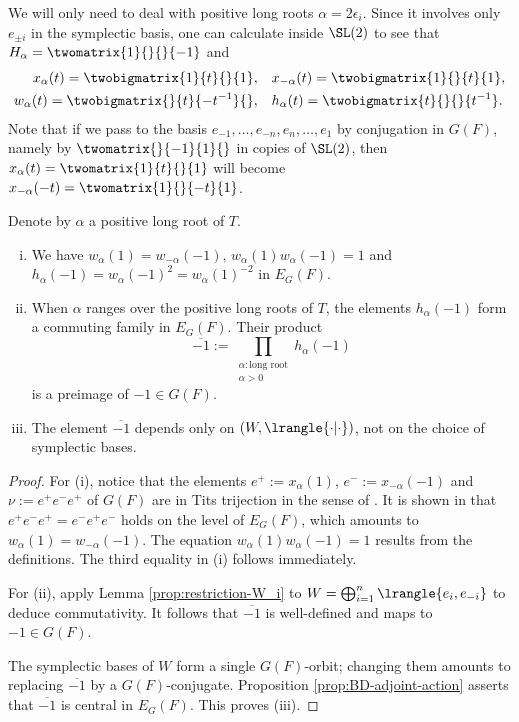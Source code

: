 \documentclass[a4paper,10pt]{article}
\begin{document}
We will only need to deal with positive long roots $\alpha = 2\epsilon_i$. Since it involves only $e_{\pm i}$ in the symplectic basis, one can calculate inside $\SL(2)$ to see that $H_\alpha = \twomatrix{1}{}{}{-1}$ and
\begin{align*}
	x_\alpha(t) = \twobigmatrix{1}{t}{}{1}, & \quad x_{-\alpha}(t) = \twobigmatrix{1}{}{t}{1}, \\
	w_\alpha(t) = \twobigmatrix{}{t}{-t^{-1}}{}, & \quad h_\alpha(t) = \twobigmatrix{t}{}{}{t^{-1}}.
\end{align*}
Note that if we pass to the basis $e_{-1}, \ldots, e_{-n}, e_n, \ldots, e_1$ by conjugation in $G(F)$, namely by $\twomatrix{}{-1}{1}{}$ in copies of $\SL(2)$, then $x_\alpha(t) = \twomatrix{1}{t}{}{1}$ will become $x_{-\alpha}(-t) = \twomatrix{1}{}{-t}{1}$.

\begin{lemma}\label{prop:minus-1-refined}
	Denote by $\alpha$ a positive long root of $T$.
	\begin{enumerate}[(i)]
		\item We have $w_\alpha(1) = w_{-\alpha}(-1)$, $w_\alpha(1) w_\alpha(-1) = 1$ and $h_\alpha(-1) = w_\alpha(-1)^2 = w_\alpha(1)^{-2}$ in $E_G(F)$.
		\item When $\alpha$ ranges over the positive long roots of $T$, the elements $h_\alpha(-1)$ form a commuting family in $E_G(F)$. Their product
			\[ \overline{-1} := \prod_{\substack{\alpha: \text{long root} \\ \alpha > 0 }} h_\alpha(-1) \]
			is a preimage of $-1 \in G(F)$.
		\item The element $\overline{-1}$ depends only on $(W, \lrangle{\cdot|\cdot})$, not on the choice of symplectic bases.
	\end{enumerate}
\end{lemma}
\begin{proof}
	For (i), notice that the elements $e^+ := x_\alpha(1)$, $e^- := x_{-\alpha}(-1)$ and $\nu := e^+ e^- e^+$ of $G(F)$ are in Tits trijection in the sense of \cite[11.1]{BD01}. It is shown in \cite[p.73]{BD01} that $e^+ e^- e^+ = e^- e^+ e^-$ holds on the level of $E_G(F)$, which amounts to $w_\alpha(1) = w_{-\alpha}(-1)$. The equation $w_\alpha(1)w_\alpha(-1)=1$ results from the definitions. The third equality in (i) follows immediately.
	
	For (ii), apply Lemma \ref{prop:restriction-W_i} to $W = \bigoplus_{i=1}^n \lrangle{e_i, e_{-i}}$ to deduce commutativity. It follows that $\overline{-1}$ is well-defined and maps to $-1 \in G(F)$.

	The symplectic bases of $W$ form a single $G(F)$-orbit; changing them amounts to replacing $\overline{-1}$ by a $G(F)$-conjugate. Proposition \ref{prop:BD-adjoint-action} asserts that $\overline{-1}$ is central in $E_G(F)$. This proves (iii).
\end{proof}
\end{document}
